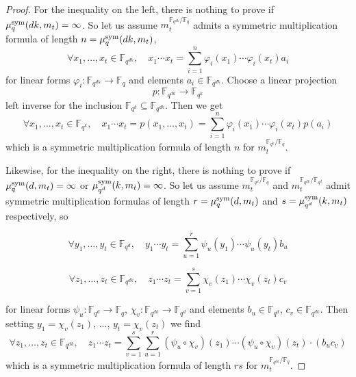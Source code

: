 \begin{proof}
For the inequality on the left, there is nothing to prove if $\mu^{\textrm{sym}}_q(dk,m_t)=\infty$.
So let us assume $m_t^{\mathbb{F}_{q^{dk}}/\mathbb{F}_{q}}$ admits a symmetric multiplication formula of length $n=\mu^{\textrm{sym}}_q(dk,m_t)$, \ie
\[\forall x_1,\dots,x_t\in\mathbb{F}_{q^{dk}},\quad x_1\cdots x_t = \sum_{i=1}^{n}\varphi_i(x_1)\cdots\varphi_i(x_t)a_i \]
for linear forms $\varphi_i:\mathbb{F}_{q^{dk}}\to\mathbb{F}_{q}$ and elements $a_i\in\mathbb{F}_{q^{dk}}$.
Choose a linear projection
\[ p:\mathbb{F}_{q^{dk}}\to\mathbb{F}_{q^{k}} \]
left inverse for the inclusion $\mathbb{F}_{q^{k}}\subseteq\mathbb{F}_{q^{dk}}$.
Then we get
\[\forall x_1,\dots,x_t\in\mathbb{F}_{q^{k}},\quad x_1\cdots x_t = p(x_1,\dots,x_t) = \sum_{i=1}^{n}\varphi_i(x_1)\cdots\varphi_i(x_t)p(a_i) \]
which is a symmetric multiplication formula of length $n$ for $m_t^{\mathbb{F}_{q^{k}}/\mathbb{F}_{q}}$.

Likewise, for the inequality on the right, there is nothing to prove if $\mu^{\textrm{sym}}_q(d,m_t)=\infty$ or $\mu^{\textrm{sym}}_{q^d}(k,m_t)=\infty$.
So let us assume $m_t^{\mathbb{F}_{q^{d}}/\mathbb{F}_{q}}$ and $m_t^{\mathbb{F}_{q^{dk}}/\mathbb{F}_{q^{d}}}$ admit symmetric multiplication formulas of length $r=\mu^{\textrm{sym}}_q(d,m_t)$ and $s=\mu^{\textrm{sym}}_{q^d}(k,m_t)$ respectively, so
\vspace{-.5\baselineskip}

\[\forall y_1,\dots,y_t\in\mathbb{F}_{q^{d}},\quad y_1\cdots y_t = \sum_{u=1}^{r}\psi_u(y_1)\cdots\psi_u(y_t)b_u \]
\vspace{-1.5\baselineskip}

\[\forall z_1,\dots,z_t\in\mathbb{F}_{q^{dk}},\quad z_1\cdots z_t = \sum_{v=1}^{s}\chi_v(z_1)\cdots\chi_v(z_t)c_v \]
\vspace{-.5\baselineskip}

\noindent for linear forms $\psi_u:\mathbb{F}_{q^{d}}\to\mathbb{F}_{q}$, $\chi_v:\mathbb{F}_{q^{dk}}\to\mathbb{F}_{q^{d}}$ and elements $b_u\in\mathbb{F}_{q^{d}}$, $c_v\in\mathbb{F}_{q^{dk}}$.
Then setting $y_1=\chi_v(z_1)$, ..., $y_t=\chi_v(z_t)$ we find
\[\forall z_1,\dots,z_t\in\mathbb{F}_{q^{dk}},\quad z_1\cdots z_t = \sum_{v=1}^{s}\sum_{u=1}^{r}(\psi_u\circ\chi_v)(z_1)\cdots(\psi_u\circ\chi_v)(z_t)\cdot(b_uc_v) \]
which is a symmetric multiplication formula of length $rs$ for $m_t^{\mathbb{F}_{q^{dk}}/\mathbb{F}_{q}}$.
\end{proof}


